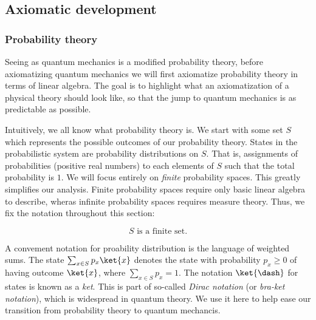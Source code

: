 

\subsection{Axiomatic development}

\subsubsection{Probability theory}

Seeing as quantum mechanics is a modified probability theory, before axiomatizing quantum mechanics we will first axiomatize probability theory in terms of linear algebra. The goal is to highlight what an axiomatization of a physical theory should look like, so that the jump to quantum mechanics is as predictable as possible.

Intuitively, we all know what probability theory is. We start with some set $S$ which represents the possible outcomes of our probability theory. States in the probabilistic system are probability distributions on $S$. That is, assignments of probabilities (positive real numbers) to each elements of $S$ such that the total probability is $1$. We will focus entirely on {\em finite} probability spaces. This greatly simplifies our analysis. Finite probability spaces require only basic linear algebra to describe, wheras infinite probability spaces requires measure theory. Thus, we fix the notation throughout this section:

$$S\text{ is a finite set.}$$

A convement notation for proability distribution is the language of weighted sums. The state $\sum_{x\in S}p_x\ket{x}$ denotes the state with probability $p_x\geq 0$ of having outcome $\ket{x}$, where $\sum_{x\in S}p_x=1$. The notation $\ket{\dash}$ for states is known as a {\em ket}. This is part of so-called {\em Dirac notation} (or {\em bra-ket notation}), which is widespread in quantum theory. We use it here to help ease our transition from probability theory to quantum mechancis.

